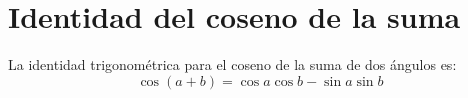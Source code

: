 \section{Identidad del coseno de la suma}\label{sec:identidad}
La identidad trigonométrica para el coseno de la suma de dos ángulos es:
\begin{equation}\label{eq:coseno_suma}
\cos(a + b) = \cos a \cos b - \sin a \sin b
\end{equation}
